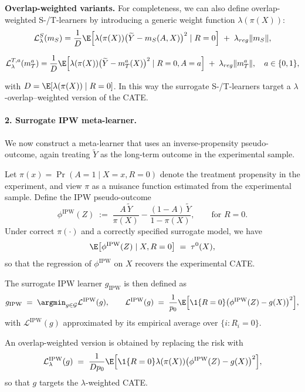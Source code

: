 \documentclass{article} %
\theoremstyle{plain} %
\theoremstyle{definition} %
\theoremstyle{remark} %
\begin{document}
\medskip
\noindent\textbf{Overlap-weighted variants.}
For completeness, we can also define overlap-weighted S-/T-learners by introducing a generic weight function $\lambda(\pi(X))$:
\begin{equation}
    \mathcal{L}^{S}_\lambda(m_S)
  = \frac{1}{D}
    \E\Big[\lambda(\pi(X))\bigl(\widetilde{Y}-m_S(A,X)\bigr)^2 \mid R=0\Big] \;+\; \lambda_{reg}\|m_S\|,
\end{equation}


\begin{equation}
    \mathcal{L}^{T,a}_\lambda(m_T^a)
  = \frac{1}{D}
    \E\Big[\lambda(\pi(X))\bigl(\widetilde{Y}-m_T^a(X)\bigr)^2 \mid R=0,A=a \Big]\;+\; \lambda_{reg}\|m_T^a\|,\quad a \in \{0,1\},
\end{equation}

with $D=\E[\lambda(\pi(X))\mid R=0]$. In this way the surrogate S-/T-learners target a $\lambda$-overlap–weighted version of the CATE.

\paragraph{2. Surrogate IPW meta-learner.}
We now construct a meta-learner that uses an inverse-propensity pseudo-outcome, again treating $\widetilde{Y}$ as the long-term outcome in the experimental sample.

Let $\pi(x)=\Pr(A=1\mid X=x,R=0)$ denote the treatment propensity in the experiment, and view $\pi$ as a nuisance function estimated from the experimental sample. Define the IPW pseudo-outcome
\[
\phi^{\mathrm{IPW}}(Z)
  \;:=\;
  \frac{A\,\widetilde{Y}}{\pi(X)} - \frac{(1-A)\,\widetilde{Y}}{1-\pi(X)}, 
  \qquad\text{for } R=0.
\]
Under correct $\pi(\cdot)$ and a correctly specified surrogate model, we have
\[
\E\bigl[\phi^{\mathrm{IPW}}(Z)\mid X,R=0\bigr]
  \;=\; \tau^0(X),
\]
so that the regression of $\phi^{\mathrm{IPW}}$ on $X$ recovers the experimental CATE.

The surrogate IPW learner $g_{\mathrm{IPW}}$ is then defined as
\[
g_{\mathrm{IPW}}
  \;=\; \argmin_{g\in\mathcal{G}} \mathcal{L}^{\mathrm{IPW}}(g),
\qquad
\mathcal{L}^{\mathrm{IPW}}(g)
  \;=\;
  \frac{1}{p_0}\E\Big[\1\{R=0\}\bigl(\phi^{\mathrm{IPW}}(Z)-g(X)\bigr)^2\Big],
\]
with $\mathcal{L}^{\mathrm{IPW}}(g)$ approximated by its empirical average over $\{i:R_i=0\}$.

An overlap-weighted version is obtained by replacing the risk with
\[
\mathcal{L}^{\mathrm{IPW}}_\lambda(g)
  \;=\;
  \frac{1}{D p_0}\E\Big[\1\{R=0\}\lambda(\pi(X))\bigl(\phi^{\mathrm{IPW}}(Z)-g(X)\bigr)^2\Big],
\]
so that $g$ targets the $\lambda$-weighted CATE.
\end{document}
